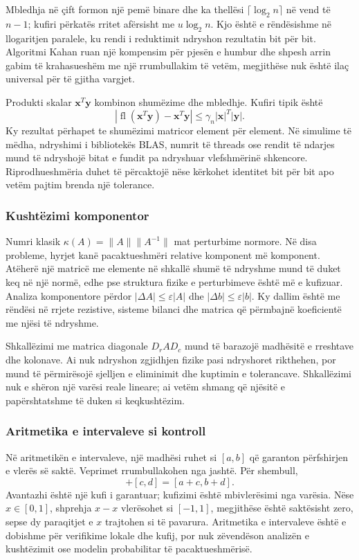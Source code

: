 \documentclass[11pt,oneside,openany]{book}
\newcommand{\vect}[1]{\bm{#1}}
\begin{document}
Mbledhja në çift formon një pemë binare dhe ka thellësi $\lceil\log_2n\rceil$ në vend të $n-1$; kufiri përkatës rritet afërsisht me $u\log_2n$. Kjo është e rëndësishme në llogaritjen paralele, ku rendi i reduktimit ndryshon rezultatin bit për bit. Algoritmi Kahan ruan një kompensim për pjesën e humbur dhe shpesh arrin gabim të krahasueshëm me një rrumbullakim të vetëm, megjithëse nuk është ilaç universal për të gjitha vargjet.

Produkti skalar $\vect x^T\vect y$ kombinon shumëzime dhe mbledhje. Kufiri tipik është
\begin{equation}
 |\operatorname{fl}(\vect x^T\vect y)-\vect x^T\vect y|
 \le\gamma_n |\vect x|^T|\vect y|.
\end{equation}
Ky rezultat përhapet te shumëzimi matricor element për element. Në simulime të mëdha, ndryshimi i bibliotekës BLAS, numrit të threads ose rendit të ndarjes mund të ndryshojë bitat e fundit pa ndryshuar vlefshmërinë shkencore. Riprodhueshmëria duhet të përcaktojë nëse kërkohet identitet bit për bit apo vetëm pajtim brenda një tolerance.

\subsubsection{Kushtëzimi komponentor}
Numri klasik $\kappa(A)=\|A\|\|A^{-1}\|$ mat perturbime normore. Në disa probleme, hyrjet kanë pacaktueshmëri relative komponent më komponent. Atëherë një matricë me elemente në shkallë shumë të ndryshme mund të duket keq në një normë, edhe pse struktura fizike e perturbimeve është më e kufizuar. Analiza komponentore përdor $|\Delta A|\le\varepsilon|A|$ dhe $|\Delta b|\le\varepsilon|b|$. Ky dallim është me rëndësi në rrjete rezistive, sisteme bilanci dhe matrica që përmbajnë koeficientë me njësi të ndryshme.

Shkallëzimi me matrica diagonale $D_rAD_c$ mund të barazojë madhësitë e rreshtave dhe kolonave. Ai nuk ndryshon zgjidhjen fizike pasi ndryshoret rikthehen, por mund të përmirësojë sjelljen e eliminimit dhe kuptimin e tolerancave. Shkallëzimi nuk e shëron një varësi reale lineare; ai vetëm shmang që njësitë e papërshtatshme të duken si keqkushtëzim.

\subsubsection{Aritmetika e intervaleve si kontroll}
Në aritmetikën e intervaleve, një madhësi ruhet si $[a,b]$ që garanton përfshirjen e vlerës së saktë. Veprimet rrumbullakohen nga jashtë. Për shembull,
\begin{equation}
 [a,b]+[c,d]=[a+c,b+d].
\end{equation}
Avantazhi është një kufi i garantuar; kufizimi është mbivlerësimi nga varësia. Nëse $x\in[0,1]$, shprehja $x-x$ vlerësohet si $[-1,1]$, megjithëse është saktësisht zero, sepse dy paraqitjet e $x$ trajtohen si të pavarura. Aritmetika e intervaleve është e dobishme për verifikime lokale dhe kufij, por nuk zëvendëson analizën e kushtëzimit ose modelin probabilitar të pacaktueshmërisë.
\end{document}
